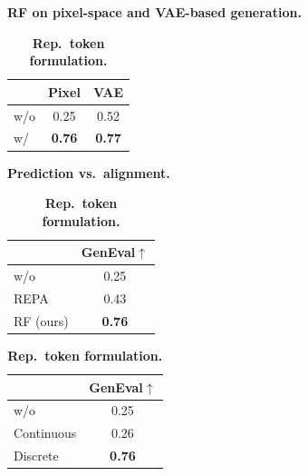 \documentclass{llmxive}
\begin{document}
\begin{table}[t]
\centering
\begin{subtable}[t]{0.32\textwidth}
\centering
\small
\caption{\textbf{RF on pixel-space and VAE-based generation.}}
\label{tab:abl_representations}
\begin{tabular}{lcc}
\toprule
 & Pixel & VAE \\
\midrule
w/o & 0.25 & 0.52 \\
w/  & \textbf{0.76} & \textbf{0.77} \\
\bottomrule
\end{tabular}
\end{subtable}
\hfill
\begin{subtable}[t]{0.32\textwidth}
\centering
\small
\caption{\textbf{Prediction vs.\ alignment.}}
\label{tab:abl_integration}
\begin{tabular}{lc}
\toprule
 & GenEval$\uparrow$ \\
\midrule
w/o      & 0.25 \\
REPA     & 0.43 \\
RF (ours) & \textbf{0.76} \\
\bottomrule
\end{tabular}
\end{subtable}
\hfill
\begin{subtable}[t]{0.32\textwidth}
\centering
\small
\caption{\textbf{Rep.\ token formulation.}}
\label{tab:abl_target}
\begin{tabular}{lc}
\toprule
 & GenEval$\uparrow$ \\
\midrule
w/o        & 0.25 \\
Continuous & 0.26 \\
Discrete   & \textbf{0.76} \\
\bottomrule
\end{tabular}
\end{subtable}


\end{table}
\end{document}
